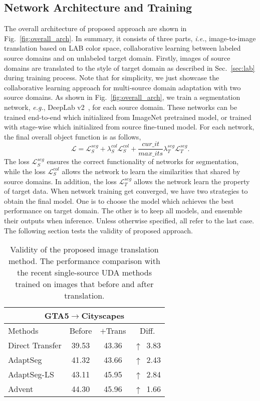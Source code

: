 \documentclass[final]{cvpr}
\def\ie{\textit{i.e.}}
\def\eg{\textit{e.g.}}
\begin{document}
\subsection{Network Architecture and Training}
The overall architecture of proposed approach are shown in Fig.~\ref{fig:overall_arch}. In summary, it consists of three parts, \ie, image-to-image translation based on LAB color space, collaborative learning between labeled source domains and on unlabeled target domain. Firstly, images of source domains are translated to the style of target domain as described in Sec.~\ref{sec:lab} during training process. Note that for simplicity, we just showcase the collaborative learning approach for multi-source domain adaptation with two source domains. As shown in Fig.~\ref{fig:overall_arch}, we train a segmentation network, \eg, DeepLab v2~\cite{chen2017deeplab}, for each source domain. These networks can be trained end-to-end which initialized from ImageNet pretrained model, or trained with stage-wise which initialized from source fine-tuned model. For each network, the final overall object function is as follows,
\begin{equation}
	\mathcal{L} = \mathcal{L}^{seg}_{S} + \lambda_S^{col}\mathcal{L}_S^{col} + \frac{cur\_it}{max\_its}\lambda_T^{seg}\mathcal{L}^{seg}_{T}.
\end{equation}
The loss $\mathcal{L}^{seg}_{S}$ ensures the correct functionality of networks for segmentation, while the loss $\mathcal{L}_S^{col}$ allows the network to learn the similarities that shared by source domains. In addition, the loss $\mathcal{L}^{seg}_{T}$ allows the network learn the property of target data. When network training get converged, we have two strategies to obtain the final model. One is to choose the model which achieves the best performance on target domain. The other is to keep all models, and ensemble their outputs when inference. Unless otherwise specified, all refer to the last case.
The following section tests the validity of proposed approach.

\begin{table}[t]
	\centering
	\caption{Validity of the proposed image translation method. The performance comparison with the recent single-source UDA methods trained on images that before and after translation.}
\label{tab:Lab_ablation}
	\vspace{1mm}
\setlength{\tabcolsep}{3.0mm}
	\begin{tabular}{l|c|c|c}
		\hline
		\multicolumn{4}{c}{GTA5$\rightarrow$Cityscapes}\\
		\hline
Methods & Before & $+$Trans & Diff. \\
		\hline
		Direct Transfer & 39.53 & 43.36 & $\uparrow$~3.83\\
		AdaptSeg~\cite{tsai2018learning} & 41.32 & 43.66 & $\uparrow$~2.43 \\
		AdaptSeg-LS~\cite{tsai2018learning} & 43.11 & 45.95 & $\uparrow$~2.84 \\
		Advent~\cite{vu2019advent} & 44.30 & 45.96 & $\uparrow$~1.66\\
		\hline
	\end{tabular}
\vspace{-12pt}
\end{table}
\end{document}
